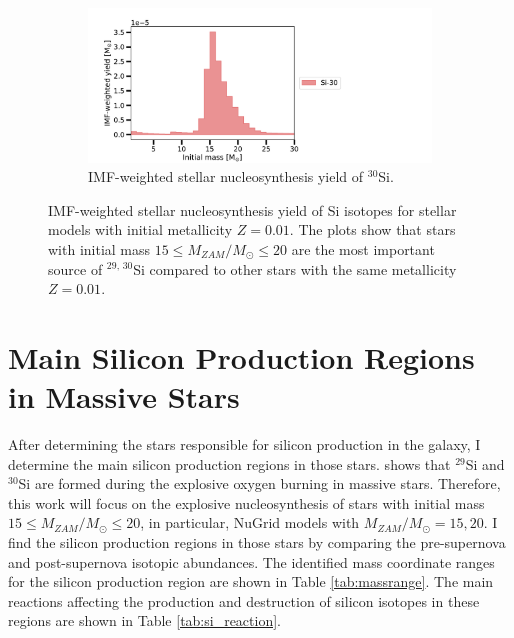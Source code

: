 \documentclass{brandeis-thesis3.2}
\def \msun {M_{\odot}}
\newcommand{\iso}[2]{$^{#1}${#2}}
\begin{document}
\begin{figure}[H]
\begin{subfigure}[c]{0.6\textwidth}
    \end{subfigure}
    \centering
    \begin{subfigure}[c]{0.6\textwidth}
        \includegraphics[width=\textwidth]{figs/Si-30_Z=0.01_yield.pdf}
        \caption{IMF-weighted stellar nucleosynthesis yield of \iso{30}{Si}.}
    \end{subfigure}
    \caption{IMF-weighted stellar nucleosynthesis yield of Si isotopes for stellar models with initial metallicity $Z=0.01$. The plots show that stars with initial mass $15\leq M_{ZAM}/\msun \leq 20$ are the most important source of \iso{29,\, 30}{Si} compared to other stars with the same metallicity $Z=0.01$.}
    \label{fig:imf_yield_0.01}
\end{figure}



\section{Main Silicon Production Regions in Massive Stars} \label{si_region}
After determining the stars responsible for silicon production in the galaxy, I determine the main silicon production regions in those stars. \cite{Curtis_2018} shows that \iso{29}{Si} and \iso{30}{Si} are formed during the explosive oxygen burning in massive stars. Therefore, this work will focus on the explosive nucleosynthesis of stars with initial mass $15 \leq M_{ZAM}/\msun \leq 20$, in particular, NuGrid models with $M_{ZAM}/\msun = 15, 20$. I find the silicon production regions in those stars by comparing the pre-supernova and post-supernova isotopic abundances. The identified mass coordinate ranges for the silicon production region are shown in Table \ref{tab:massrange}. The main reactions affecting the production and destruction of silicon isotopes in these regions are shown in Table \ref{tab:si_reaction}.
\end{document}
